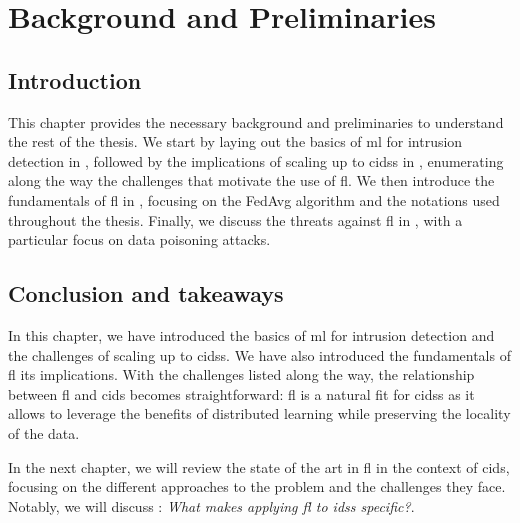\chapter{Background and Preliminaries\label{chap:background}}
\localtoc


\section{Introduction\label{sec:bg.intro}}

This chapter provides the necessary background and preliminaries to understand the rest of the thesis. 
We start by laying out the basics of \gls{ml} for intrusion detection in , followed by the implications of scaling up to \glspl{cids} in , enumerating along the way the challenges that motivate the use of \gls{fl}.
We then introduce the fundamentals of \gls{fl} in , focusing on the FedAvg algorithm and the notations used throughout the thesis.
Finally, we discuss the threats against \gls{fl} in , with a particular focus on data poisoning attacks.






\section{Conclusion and takeaways\label{sec:bg.conclusion}}

In this chapter, we have introduced the basics of \gls{ml} for intrusion detection and the challenges of scaling up to \glspl{cids}.
We have also introduced the fundamentals of \gls{fl} its implications.
With the challenges listed along the way, the relationship between \gls{fl} and \gls{cids} becomes straightforward: \gls{fl} is a natural fit for \glspl{cids} as it allows to leverage the benefits of distributed learning while preserving the locality of the data.

In the next chapter, we will review the state of the art in \gls{fl} in the context of \gls{cids}, focusing on the different approaches to the problem and the challenges they face.
Notably, we will discuss : \emph{What makes applying \gls{fl} to \glspl{ids} specific?}.





